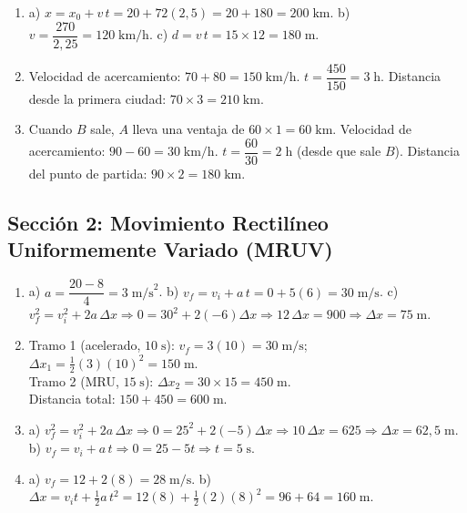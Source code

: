 \documentclass[12pt, letterpaper]{article}
\begin{document}
  \begin{enumerate}[leftmargin=*, label=\textbf{\arabic*.}]
    \item a) $x = x_0 + v\,t = 20 + 72(2{,}5) = 20 + 180 = 200\;\text{km}$.
          \quad b) $v = \dfrac{270}{2{,}25} = 120\;\text{km/h}$.
          \quad c) $d = v\,t = 15 \times 12 = 180\;\text{m}$.

    \item Velocidad de acercamiento: $70 + 80 = 150\;\text{km/h}$. \quad $t = \dfrac{450}{150} = 3\;\text{h}$.
          Distancia desde la primera ciudad: $70 \times 3 = 210\;\text{km}$.

    \item Cuando $B$ sale, $A$ lleva una ventaja de $60 \times 1 = 60\;\text{km}$.
          Velocidad de acercamiento: $90 - 60 = 30\;\text{km/h}$. \quad $t = \dfrac{60}{30} = 2\;\text{h}$ (desde que sale $B$).
          Distancia del punto de partida: $90 \times 2 = 180\;\text{km}$.
  \end{enumerate}

  \newpage

  \subsection*{Sección 2: Movimiento Rectilíneo Uniformemente Variado (MRUV)}

  \begin{enumerate}[leftmargin=*, label=\textbf{\arabic*.}]
    \item a) $a = \dfrac{20 - 8}{4} = 3\;\text{m/s}^2$.
          \quad b) $v_f = v_i + a\,t = 0 + 5(6) = 30\;\text{m/s}$.
          \quad c) $v_f^2 = v_i^2 + 2a\,\Delta x \Rightarrow 0 = 30^2 + 2(-6)\Delta x \Rightarrow 12\,\Delta x = 900 \Rightarrow \Delta x = 75\;\text{m}$.

    \item Tramo 1 (acelerado, $10\;\text{s}$): $v_f = 3(10) = 30\;\text{m/s}$; $\Delta x_1 = \tfrac{1}{2}(3)(10)^2 = 150\;\text{m}$.
          \\[2pt]
          Tramo 2 (MRU, $15\;\text{s}$): $\Delta x_2 = 30 \times 15 = 450\;\text{m}$.
          \\[2pt]
          Distancia total: $150 + 450 = 600\;\text{m}$.

    \item a) $v_f^2 = v_i^2 + 2a\,\Delta x \Rightarrow 0 = 25^2 + 2(-5)\Delta x \Rightarrow 10\,\Delta x = 625 \Rightarrow \Delta x = 62{,}5\;\text{m}$.
          \quad b) $v_f = v_i + a\,t \Rightarrow 0 = 25 - 5t \Rightarrow t = 5\;\text{s}$.

    \item a) $v_f = 12 + 2(8) = 28\;\text{m/s}$.
          \quad b) $\Delta x = v_i t + \tfrac{1}{2}a\,t^2 = 12(8) + \tfrac{1}{2}(2)(8)^2 = 96 + 64 = 160\;\text{m}$.
  \end{enumerate}
\end{document}
